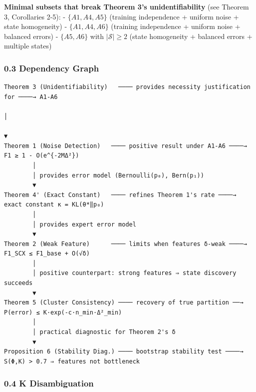 \documentclass[
  12pt,
]{ctexart}
\begin{document}
\textbf{Minimal subsets that break Theorem 3's unidentifiability} (see
Theorem 3, Corollaries 2-5): - \(\{A1, A4, A5\}\) (training independence
+ uniform noise + state homogeneity) - \(\{A1, A4, A6\}\) (training
independence + uniform noise + balanced errors) - \(\{A5, A6\}\) with
\(|\mathcal{S}| \geq 2\) (state homogeneity + balanced errors + multiple
states)

\subsubsection{0.3 Dependency Graph}\label{dependency-graph}

\begin{verbatim}
Theorem 3 (Unidentifiability)   ──── provides necessity justification for ────→ A1-A6
                                                                                      │
                                                                                      ▼
Theorem 1 (Noise Detection)   ──── positive result under A1-A6 ────→  F1 ≥ 1 - O(e^{-2MΔ²})
        │                                                                          
        │ provides error model (Bernoulli(p₀), Bern(p₁))                           
        ▼                                                                          
Theorem 4' (Exact Constant)   ──── refines Theorem 1's rate ────→  exact constant κ = KL(θ*‖p₀)
        │                                                                          
        │ provides expert error model                                               
        ▼                                                                          
Theorem 2 (Weak Feature)      ──── limits when features δ-weak ────→  F1_SCX ≤ F1_base + O(√δ)
        │                                                                          
        │ positive counterpart: strong features ⇒ state discovery succeeds         
        ▼                                                                          
Theorem 5 (Cluster Consistency) ──── recovery of true partition ──→  P(error) ≤ K·exp(-c·n_min·Δ²_min)
        │                                                                          
        │ practical diagnostic for Theorem 2's δ                                    
        ▼                                                                          
Proposition 6 (Stability Diag.) ──── bootstrap stability test ────→  S(Φ,K) > 0.7 ⇒ features not bottleneck
\end{verbatim}

\subsubsection{0.4 K Disambiguation}\label{k-disambiguation}
\end{document}
